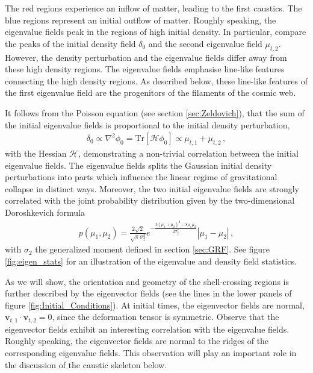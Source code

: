 \documentclass[a4paper, 11pt]{article}
\begin{document}
The red regions experience an inflow of matter, leading to the first caustics. The blue regions represent an initial outflow of matter. Roughly speaking, the eigenvalue fields peak in the regions of high initial density. In particular, compare the peaks of the initial density field $\delta_0$ and the second eigenvalue field $\mu_{t,2}$. However, the density perturbation and the eigenvalue fields differ away from these high density regions. The eigenvalue fields emphasise line-like features connecting the high density regions. As described below, these line-like features of the first eigenvalue field are the progenitors of the filaments of the cosmic web. 

It follows from the Poisson equation (see section \ref{sec:Zeldovich}), that the sum of the initial eigenvalue fields is proportional to the initial density perturbation, 
\begin{align}
\delta_0 \propto \nabla^2 \phi_0 = \text{Tr}[\mathcal{H}\phi_0] \propto \mu_{t,1} + \mu_{t,2}\,,
\end{align}
with the Hessian $\mathcal{H}$, demonstrating a non-trivial correlation between the initial eigenvalue fields. The eigenvalue fields splits the Gaussian initial density perturbations into parts which influence the linear regime of gravitational collapse in distinct ways. Moreover, the two initial eigenvalue fields are strongly correlated with the joint probability distribution given by the two-dimensional Doroshkevich formula \cite{Doroshkevich:1970, Feldbrugge:2014}
\begin{align}
p(\mu_1,\mu_2) = \frac{2\sqrt{2}}{\sqrt{\pi} \sigma_2^3} e^{-\frac{3(\mu_1+\mu_2)^2-8\mu_1 \mu_2}{2 \sigma_2^2}}|\mu_1-\mu_2|\,,
\end{align}
with $\sigma_2$ the generalized moment defined in section \ref{sec:GRF}. See figure \ref{fig:eigen_stats} for an illustration of the eigenvalue and density field statistics. 

As we will show, the orientation and geometry of the shell-crossing regions is further described by the eigenvector fields (see the lines in the lower panels of figure \ref{fig:Initial_Conditions}). At initial times, the eigenvector fields are normal, $\bm{v}_{t,1}\cdot \bm{v}_{t,2}=0$, since the deformation tensor is symmetric. Observe that the eigenvector fields exhibit an interesting correlation with the eigenvalue fields. Roughly speaking, the eigenvector fields are normal to the ridges of the corresponding eigenvalue fields. This observation will play an important role in the discussion of the caustic skeleton below. 
\end{document}
